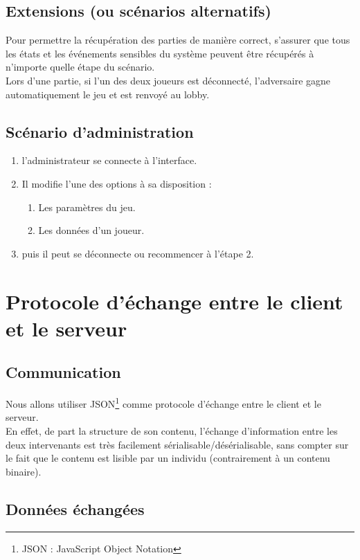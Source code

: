 \documentclass[a4paper,11pt]{article}
\begin{document}
		\subsection{Extensions (ou scénarios alternatifs)}
		Pour permettre la récupération des parties de manière correct, s'assurer que tous les états et les	événements sensibles du système peuvent être récupérés à n'importe quelle étape du scénario. \\

		Lors d'une partie, si l'un des deux joueurs est déconnecté, l'adversaire gagne automatiquement le jeu et est renvoyé au lobby.

		\subsection{Scénario d'administration}
		\begin{enumerate}
			\item l'administrateur se connecte à l'interface.
			\item Il modifie l'une des options à sa disposition :
			\begin{enumerate}
				\item Les paramètres du jeu.
				\item Les données d'un joueur.
			\end{enumerate}
			\item puis il peut se déconnecte ou recommencer à l'étape 2.
		\end{enumerate}


	\newpage
	\section{Protocole d'échange entre le client et le serveur}
		\subsection{Communication}
			Nous allons utiliser JSON\footnote{JSON : JavaScript Object Notation} comme protocole d'échange entre le client et le serveur. \\
			En effet, de part la structure de son contenu, l'échange d'information entre les deux intervenants est très facilement sérialisable/désérialisable, sans compter sur le fait que le contenu est lisible par un individu (contrairement à un contenu binaire).
		\subsection{Données échangées}
\end{document}
